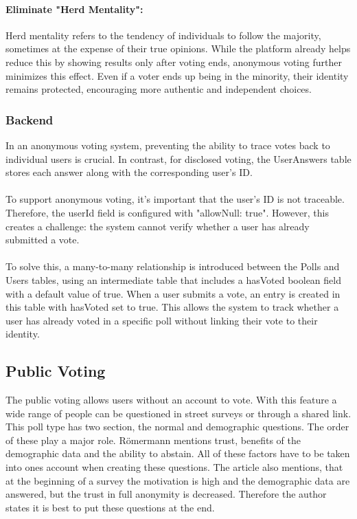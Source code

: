 \documentclass[a4paper,12pt]{report}
\begin{document}
\paragraph{Eliminate "Herd Mentality":}
Herd mentality refers to the tendency of individuals to follow the majority, sometimes at the expense of their true opinions. While the platform already helps reduce this by showing results only after voting ends, anonymous voting further minimizes this effect. Even if a voter ends up being in the minority, their identity remains protected, encouraging more authentic and independent choices.  \parencite{disvsanon}

\subsubsection{Backend}
In an anonymous voting system, preventing the ability to trace votes back to individual users is crucial. In contrast, for disclosed voting, the UserAnswers table stores each answer along with the corresponding user's ID.\\ \\
To support anonymous voting, it's important that the user's ID is not traceable. Therefore, the userId field is configured with "allowNull: true". However, this creates a challenge: the system cannot verify whether a user has already submitted a vote.\\ \\
To solve this, a many-to-many relationship is introduced between the Polls and Users tables, using an intermediate table that includes a hasVoted boolean field with a default value of true. When a user submits a vote, an entry is created in this table with hasVoted set to true. This allows the system to track whether a user has already voted in a specific poll without linking their vote to their identity.

\subsection{Public Voting}
The public voting allows users without an account to vote. With this feature a wide range of people can be questioned in street surveys or through a shared link. This poll type has two section, the normal and demographic questions. The order of these play a major role. Römermann mentions trust, benefits of the demographic data and the ability to abstain. All of these factors have to be taken into ones account when creating these questions. The article also mentions, that at the beginning of a survey the motivation is high and the demographic data are answered, but the trust in full anonymity is decreased. Therefore the author states it is best to put these questions at the end. \cite{demographicdata}
\end{document}
